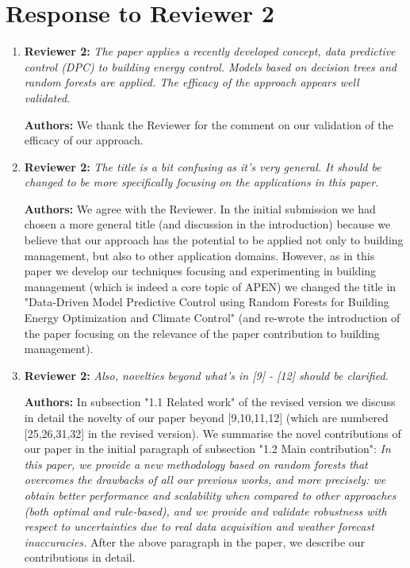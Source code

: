 \documentclass{article}
\begin{document}
\section{Response to Reviewer 2}



\begin{enumerate}

\item \textbf{Reviewer 2:} \textit{The paper applies a recently developed concept, data predictive control (DPC) to building energy control. Models based on decision trees and random forests are applied. The efficacy of the approach appears well validated.}



\textbf{Authors:} We thank the Reviewer for the comment on our validation of the efficacy of our approach.



\item \textbf{Reviewer 2:} \textit{The title is a bit confusing as it's very general. It should be changed to be more specifically focusing on the applications in this paper.}



\textbf{Authors:} We agree with the Reviewer. In the initial submission we had chosen a more general title (and discussion in the introduction) because we believe that our approach has the potential to be applied not only to building management, but also to other application domains. However, as in this paper we develop our techniques focusing and experimenting in building management (which is indeed a core topic of APEN) we changed the title in "Data-Driven Model Predictive Control using Random Forests for Building Energy Optimization and Climate Control" (and re-wrote the introduction of the paper focusing on the relevance of the paper contribution to building management). 



\item \textbf{Reviewer 2:} \textit{Also, novelties beyond what's in [9] - [12] should be clarified.}



\textbf{Authors:} In subsection "1.1 Related work" of the revised version we discuss in detail the novelty of our paper beyond [9,10,11,12] (which are numbered [25,26,31,32] in the revised version). We summarise the novel contributions of our paper in the initial paragraph of subsection "1.2 Main contribution":
\textit{In this paper, we provide a new methodology based on random forests that overcomes the drawbacks of all our previous works, and more precisely: we obtain better performance and scalability when compared to other approaches (both optimal and rule-based), and we provide and validate robustness with respect to uncertainties due to real data acquisition and weather forecast inaccuracies.}
After the above paragraph in the paper, we describe our contributions in detail.




\end{enumerate}
\end{document}
